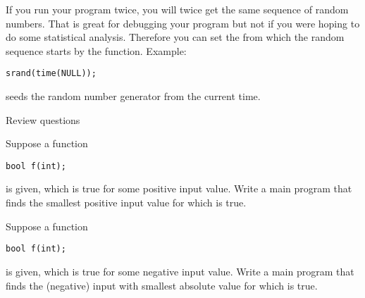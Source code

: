 If you run your program twice, you will twice get the same sequence of
random numbers. That is great for debugging your program but not if
you were hoping to do some statistical analysis. Therefore you can set
the  from which the random sequence
starts by the  function. Example:
\begin{verbatim}
srand(time(NULL));
\end{verbatim}
seeds the random number generator from the current time.

 {Review questions}

\begin{exercise}
  \label{ex:cpp-funcloop1}
  Suppose a function
\begin{verbatim}
bool f(int);
\end{verbatim}
is given, which is true for some positive input value. Write a main program that
finds the smallest positive input value for which  is true.
\end{exercise}

\begin{exercise}
  \label{ex:cpp-funcloop2}
  Suppose a function
\begin{verbatim}
bool f(int);
\end{verbatim}
is given, which is true for some negative input value. Write a main program that
finds the (negative) input with smallest absolute value for which  is true.
\end{exercise}
